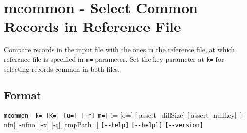 
%

\section{mcommon - Select Common Records in Reference File\label{sect:mcommon}}
Compare records in the input file with the ones in the reference file, at which reference file is specified in \verb|m=| parameter. Set the key parameter at \verb|k=| for selecting records common in both files. 

\subsection*{Format}
\verb/mcommon  k= [K=] [u=] [-r] m=|/
\hyperref[sect:option_i]{i=}
\hyperref[sect:option_o]{[o=]}
\hyperref[sect:option_assert_diffSize]{[-assert\_diffSize]}
\hyperref[sect:option_assert_nullkey]{[-assert\_nullkey]}
\hyperref[sect:option_nfn]{[-nfn]} 
\hyperref[sect:option_nfno]{[-nfno]}  
\hyperref[sect:option_x]{[-x]}
\hyperref[sect:option_q]{[-q]}
\hyperref[sect:option_option_tmppath]{[tmpPath=]}
\verb|[--help]|
\verb|[--helpl]|
\verb|[--version]|\\

